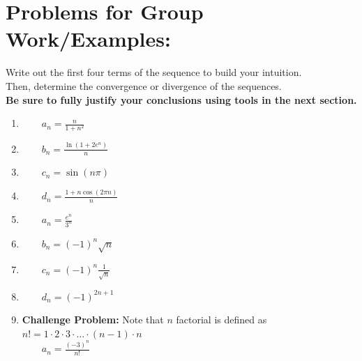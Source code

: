 \documentclass[10pt]{article}
\begin{document}
\section*{Problems for Group Work/Examples:}
\vspace*{.1in}
Write out the first four terms of the sequence to build your intuition.\\ %
Then, determine the convergence or divergence of the sequences.\\ %
\textbf{Be sure to fully justify your conclusions using tools in the next section.}
\vfill
\setlength{\columnseprule}{0pt}
\begin{enumerate}


\item \(\qquad a_n = \frac{n}{1+n^2}\) \vspace*{.25in}

\item \(\qquad b_n = \frac{\ln(1+2e^n)}{n}\) \vspace*{.25in}

\item \(\qquad c_n = \sin(n\pi)\)\vspace*{.25in}

\item \(\qquad d_n = \frac{1+n\cos(2\pi n)}{n}\)\vspace*{.25in}

\item \(\qquad a_n = \frac{e^n}{3^n}\)\vspace*{.25in}

\item \(\qquad b_n =(-1)^n \sqrt{n}\) \vspace*{.25in}

\item \(\qquad c_n =(-1)^n \frac{1}{\sqrt{n}}\) \vspace*{.25in}

\item \(\qquad d_n =(-1)^{2n+1} \) \vspace*{.25in}

\vfill

\item \textbf{Challenge Problem:} Note that \(n\) factorial is defined as \(n! = 1\cdot 2 \cdot 3 \cdot \ldots \cdot (n-1) \cdot n \)\\
 \(\qquad a_n =\frac{(-3)^n}{n!} \) 

\vfill
\end{enumerate}
\end{document}
